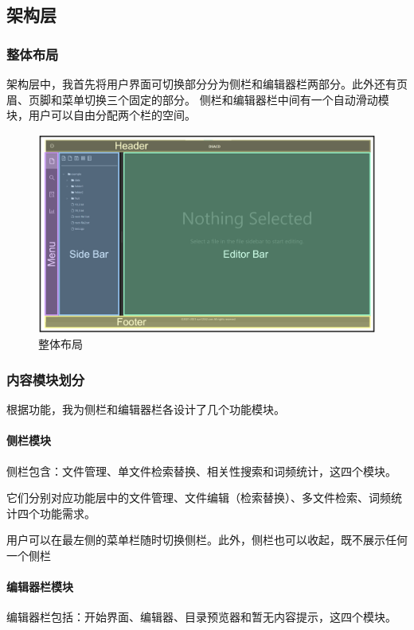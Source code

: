 \documentclass[scheme = chinese]{ctexart}
\begin{document}
\subsection{架构层}
\subsubsection{整体布局}
架构层中，我首先将用户界面可切换部分分为侧栏和编辑器栏两部分。此外还有页眉、页脚和菜单切换三个固定的部分。
侧栏和编辑器栏中间有一个自动滑动模块，用户可以自由分配两个栏的空间。

\begin{figure}[h]
    \centering
    \includegraphics[width=\textwidth]{images/dsacd-screenshot-layout-.drawio.png}
    \caption{整体布局}
\end{figure}

\clearpage

\subsubsection{内容模块划分}
根据功能，我为侧栏和编辑器栏各设计了几个功能模块。

\paragraph{侧栏模块} 侧栏包含：文件管理、单文件检索替换、相关性搜索和词频统计，这四个模块。

它们分别对应功能层中的文件管理、文件编辑（检索替换）、多文件检索、词频统计四个功能需求。

用户可以在最左侧的菜单栏随时切换侧栏。此外，侧栏也可以收起，既不展示任何一个侧栏

\paragraph{编辑器栏模块} 编辑器栏包括：开始界面、编辑器、目录预览器和暂无内容提示，这四个模块。
\end{document}
